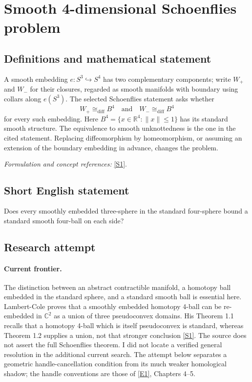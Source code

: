 \documentclass[11pt,a4paper]{article}
\newcommand{\R}{\mathbb{R}}
\newcommand{\C}{\mathbb{C}}
\newcommand{\sref}[2]{\hyperlink{source:#1:#2}{[S#2]}}
\newcommand{\eref}[2]{\hyperlink{extra:#1:#2}{[E#2]}}
\newif\ifshowcatalogue
\newcommand{\cataloguescope}[1]{\ifshowcatalogue
 \paragraph{Exact scope in the supplied catalogue.}
 \begin{quote}\small #1\end{quote}\fi}
\numberwithin{equation}{section}
\begin{document}
\setcounter{section}{0}
\clearpage
\section*{\texorpdfstring{Smooth 4-dimensional Schoenflies problem}{Smooth 4-dimensional Schoenflies problem}}\label{3410}
\subsection{Definitions and mathematical statement}
A smooth embedding $e:S^3\hookrightarrow S^4$ has two complementary components; write $W_+$ and $W_-$ for their closures, regarded as smooth manifolds with boundary using collars along $e(S^3)$. The selected Schoenflies statement asks whether
\[
 W_+\cong_{\mathrm{diff}}B^4\quad\text{and}\quad W_-\cong_{\mathrm{diff}}B^4
\]
for every such embedding. Here $B^4=\{x\in\R^4:\|x\|\le1\}$ has its standard smooth structure. The equivalence to smooth unknottedness is the one in the cited statement. Replacing diffeomorphism by homeomorphism, or assuming an extension of the boundary embedding in advance, changes the problem.
\par\smallskip\textit{Formulation and concept references:} \sref{3410}{1}.
\cataloguescope{Determine whether every smooth embedding of S\textasciicircum{}3 in S\textasciicircum{}4 is smoothly unknotted; equivalently, whether each of its two complementary closures is diffeomorphic to the standard 4-ball B\textasciicircum{}4.}
\subsection{Short English statement}
Does every smoothly embedded three-sphere in the standard four-sphere bound a standard smooth four-ball on each side?
\subsection{Research attempt}

\paragraph{Current frontier.}
The distinction between an abstract contractible manifold, a homotopy
ball embedded in the standard sphere, and a standard smooth ball is
essential here. Lambert-Cole proves that a smoothly embedded homotopy
4-ball can be re-embedded in $\C^2$ as a union of three pseudoconvex
domains. His Theorem 1.1 recalls that a homotopy 4-ball which is itself
pseudoconvex is standard, whereas Theorem 1.2 supplies a union, not that
stronger conclusion \sref{3410}{1}. The source does not assert the full
Schoenflies theorem. I did not locate a verified general resolution in
the additional current search. The attempt below separates a geometric
handle-cancellation condition from its much weaker homological shadow;
the handle conventions are those of \eref{3410}{1}, Chapters 4--5.
\end{document}
